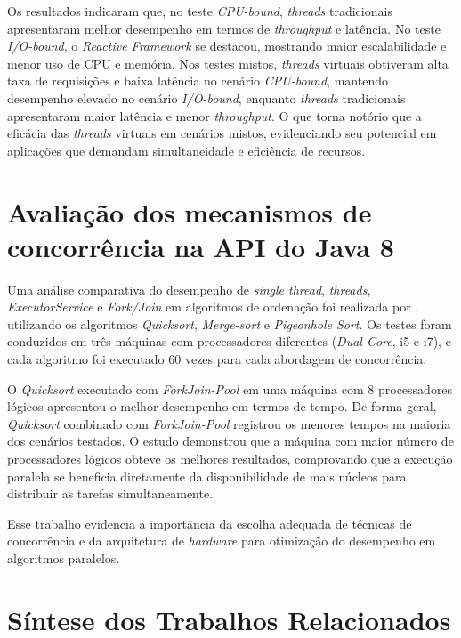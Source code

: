 \documentclass[12pt, openright, oneside, a4paper, english,	french,	spanish, brazil	]{abntex2}
\begin{document}
        Os resultados indicaram que, no teste \textit{CPU-bound}, \textit{threads} tradicionais apresentaram melhor desempenho em termos de \textit{throughput} e latência. No teste \textit{I/O-bound}, o \textit{Reactive Framework} se destacou, mostrando maior escalabilidade e menor uso de CPU e memória. Nos testes mistos, \textit{threads} virtuais obtiveram alta taxa de requisições e baixa latência no cenário \textit{CPU-bound}, mantendo desempenho elevado no cenário \textit{I/O-bound}, enquanto \textit{threads} tradicionais apresentaram maior latência e menor \textit{throughput}. O que torna notório que a eficácia das \textit{threads} virtuais em cenários mistos, evidenciando seu potencial em aplicações que demandam simultaneidade e eficiência de recursos. 

    \section{Avaliação dos mecanismos de concorrência na API do Java 8}
        Uma análise comparativa do desempenho de \textit{single thread}, \textit{threads}, \textit{ExecutorService} e \textit{Fork/Join} em algoritmos de ordenação foi realizada por , utilizando os algoritmos \textit{Quicksort}, \textit{Merge-sort} e \textit{Pigeonhole Sort}. Os testes foram conduzidos em três máquinas com processadores diferentes (\textit{Dual-Core}, i5 e i7), e cada algoritmo foi executado 60 vezes para cada abordagem de concorrência.

        O \textit{Quicksort} executado com \textit{ForkJoin-Pool} em uma máquina com 8 processadores lógicos apresentou o melhor desempenho em termos de tempo. De forma geral, \textit{Quicksort} combinado com \textit{ForkJoin-Pool} registrou os menores tempos na maioria dos cenários testados. O estudo demonstrou que a máquina com maior número de processadores lógicos obteve os melhores resultados, comprovando que a execução paralela se beneficia diretamente da disponibilidade de mais núcleos para distribuir as tarefas simultaneamente.

        Esse trabalho evidencia a importância da escolha adequada de técnicas de concorrência e da arquitetura de \textit{hardware} para otimização do desempenho em algoritmos paralelos.
    
    \section{Síntese dos Trabalhos Relacionados}
\end{document}
